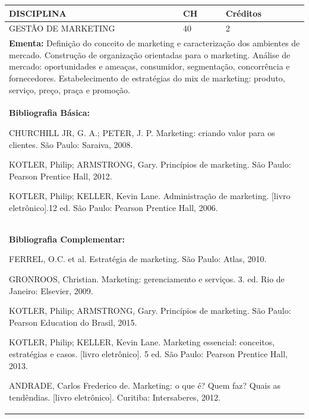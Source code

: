 \documentclass[a4paper, 12pt, openright, oneside, german, french, english, brazil]{abntex2}
\begin{document}
\begin{table}[!h]
  \footnotesize
  \centering
  \begin{tabular}{|p{100mm}|p{10mm}|p{20mm}|}
    \hline
    \textbf{DISCIPLINA} & \textbf{CH} & \textbf{Créditos} \\
    \hline
    GESTÃO DE MARKETING  & 40 & 2 \\
    \hline
    \multicolumn{3}{|p{130mm}|}{\textbf{Ementa:} Definição do conceito de marketing e caracterização dos ambientes de mercado. Construção de organização orientadas para o marketing. Análise de mercado: oportunidades e ameaças, consumidor, segmentação, concorrência e fornecedores. Estabelecimento de estratégias do mix de marketing: produto, serviço, preço, praça e promoção. } \\
    \hline
    \multicolumn{3}{|p{130mm}|}{\textbf{Bibliografia Básica:}

    CHURCHILL JR, G. A.; PETER, J. P. Marketing: criando valor para os clientes. São Paulo: Saraiva, 2008.

KOTLER, Philip; ARMSTRONG, Gary. Princípios de marketing. São Paulo: Pearson Prentice Hall, 2012.

KOTLER, Philip; KELLER, Kevin Lane. Administração de marketing. [livro eletrônico].12 ed. São Paulo: Pearson Prentice Hall, 2006.
} \\
    \hline
    \multicolumn{3}{|p{130mm}|}{\textbf{Bibliografia Complementar:}

    FERREL, O.C. et al. Estratégia de marketing. São Paulo: Atlas, 2010.

GRONROOS, Christian. Marketing: gerenciamento e serviços. 3. ed. Rio de Janeiro: Elsevier, 2009.

KOTLER, Philip; ARMSTRONG, Gary. Princípios de marketing. São Paulo: Pearson Education do Brasil, 2015.

KOTLER, Philip; KELLER, Kevin Lane. Marketing essencial: conceitos, estratégias e casos. [livro eletrônico]. 5 ed. São Paulo: Pearson Prentice Hall, 2013.

ANDRADE, Carlos Frederico de. Marketing: o que é? Quem faz? Quais as tendêndias. [livro eletrônico]. Curitiba: Intersaberes, 2012.
} \\
    \hline
  \end{tabular}
\end{table}
\end{document}
